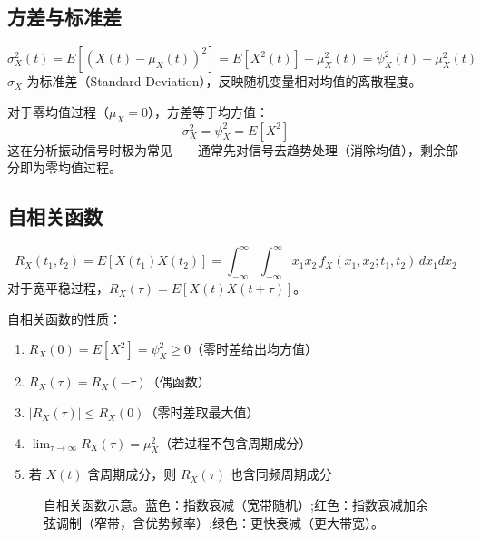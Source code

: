 \subsection{方差与标准差}
\begin{definition}[方差函数]
\[
\sigma_X^{2}(t) = E[(X(t) - \mu_X(t))^{2}] = E[X^{2}(t)] - \mu_X^{2}(t) = \psi_X^{2}(t) - \mu_X^{2}(t)
\]
$\sigma_X$ 为标准差（Standard Deviation），反映随机变量相对均值的离散程度。
\end{definition}

\begin{myformula}
对于零均值过程（$\mu_X = 0$），方差等于均方值：
\[
\sigma_X^{2} = \psi_X^{2} = E[X^{2}]
\]
这在分析振动信号时极为常见——通常先对信号去趋势处理（消除均值），剩余部分即为零均值过程。
\end{myformula}

\subsection{自相关函数}
\begin{definition}[自相关函数]
\[
R_X(t_1, t_2) = E[X(t_1) X(t_2)] = \int_{-\infty}^{\infty}\int_{-\infty}^{\infty} x_1 x_2\, f_X(x_1, x_2; t_1, t_2)\, dx_1 dx_2
\]
对于宽平稳过程，$R_X(\tau) = E[X(t)X(t+\tau)]$。
\end{definition}

自相关函数的性质：
\begin{enumerate}
    \item $R_X(0) = E[X^{2}] = \psi_X^{2} \ge 0$（零时差给出均方值）
    \item $R_X(\tau) = R_X(-\tau)$（偶函数）
    \item $|R_X(\tau)| \le R_X(0)$（零时差取最大值）
    \item $\lim_{\tau \to \infty} R_X(\tau) = \mu_X^{2}$（若过程不包含周期成分）
    \item 若 $X(t)$ 含周期成分，则 $R_X(\tau)$ 也含同频周期成分
\end{enumerate}

\begin{figure}[H]
\centering
{}
\caption{自相关函数示意。蓝色：指数衰减（宽带随机）;红色：指数衰减加余弦调制（窄带，含优势频率）;绿色：更快衰减（更大带宽）。}
\label{fig:ch11_autocorr}
\end{figure}

